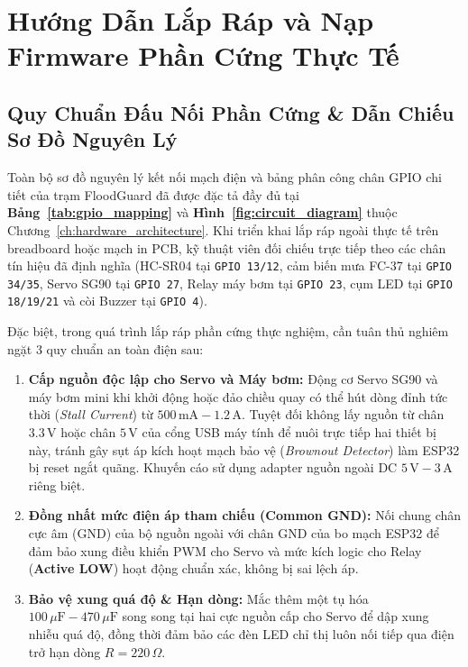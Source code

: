 \section{Hướng Dẫn Lắp Ráp và Nạp Firmware Phần Cứng Thực Tế}

\subsection{Quy Chuẩn Đấu Nối Phần Cứng \& Dẫn Chiếu Sơ Đồ Nguyên Lý}
Toàn bộ sơ đồ nguyên lý kết nối mạch điện và bảng phân công chân GPIO chi tiết của trạm FloodGuard đã được đặc tả đầy đủ tại \textbf{Bảng~\ref{tab:gpio_mapping}} và \textbf{Hình~\ref{fig:circuit_diagram}} thuộc Chương~\ref{ch:hardware_architecture}. Khi triển khai lắp ráp ngoài thực tế trên breadboard hoặc mạch in PCB, kỹ thuật viên đối chiếu trực tiếp theo các chân tín hiệu đã định nghĩa (HC-SR04 tại \texttt{GPIO 13/12}, cảm biến mưa FC-37 tại \texttt{GPIO 34/35}, Servo SG90 tại \texttt{GPIO 27}, Relay máy bơm tại \texttt{GPIO 23}, cụm LED tại \texttt{GPIO 18/19/21} và còi Buzzer tại \texttt{GPIO 4}).

Đặc biệt, trong quá trình lắp ráp phần cứng thực nghiệm, cần tuân thủ nghiêm ngặt 3 quy chuẩn an toàn điện sau:
\begin{enumerate}
    \item \textbf{Cấp nguồn độc lập cho Servo và Máy bơm:} Động cơ Servo SG90 và máy bơm mini khi khởi động hoặc đảo chiều quay có thể hút dòng đỉnh tức thời (\textit{Stall Current}) từ $500\,\text{mA} - 1.2\,\text{A}$. Tuyệt đối không lấy nguồn từ chân $3.3\,\text{V}$ hoặc chân $5\,\text{V}$ của cổng USB máy tính để nuôi trực tiếp hai thiết bị này, tránh gây sụt áp kích hoạt mạch bảo vệ (\textit{Brownout Detector}) làm ESP32 bị reset ngắt quãng. Khuyến cáo sử dụng adapter nguồn ngoài DC $5\,\text{V} - 3\,\text{A}$ riêng biệt.
    \item \textbf{Đồng nhất mức điện áp tham chiếu (Common GND):} Nối chung chân cực âm (GND) của bộ nguồn ngoài với chân GND của bo mạch ESP32 để đảm bảo xung điều khiển PWM cho Servo và mức kích logic cho Relay (\textbf{Active LOW}) hoạt động chuẩn xác, không bị sai lệch áp.
    \item \textbf{Bảo vệ xung quá độ \& Hạn dòng:} Mắc thêm một tụ hóa $100\,\mu\text{F} - 470\,\mu\text{F}$ song song tại hai cực nguồn cấp cho Servo để dập xung nhiễu quá độ, đồng thời đảm bảo các đèn LED chỉ thị luôn nối tiếp qua điện trở hạn dòng $R = 220\,\Omega$.
\end{enumerate}

